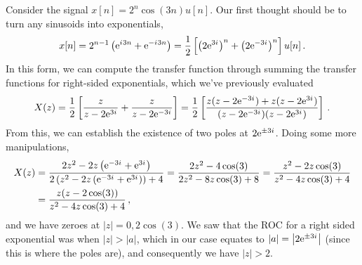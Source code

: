\begin{exmp}
  Consider the signal $x[n] = 2^n\cos(3n)u[n]$. Our first thought should be
  to turn any sinusoids into exponentials,
  \begin{displaymath}
    x[n] = 2^{n-1}\left(\mathrm{e}^{{i\mkern1mu} 3n} + \mathrm{e}^{-{i\mkern1mu} 3n}\right) = \frac{1}{2}\left[
      \left(2\mathrm{e}^{3{i\mkern1mu}}\right)^n + \left(2\mathrm{e}^{-3{i\mkern1mu}}\right)^n 
    \right] u[n] \,.
  \end{displaymath}
  In this form, we can compute the transfer function through summing
  the transfer functions for right-sided exponentials, which we've previously
  evaluated
  \begin{displaymath}
    X(z) = \frac{1}{2}\left[\frac{z}{z - 2\mathrm{e}^{3{i\mkern1mu}}} + \frac{z}{z - 2\mathrm{e}^{-3{i\mkern1mu}}}\right]
    = \frac{1}{2}\left[\frac{z(z-2\mathrm{e}^{-3{i\mkern1mu}}) + z(z - 2\mathrm{e}^{3{i\mkern1mu}})}{(z-2\mathrm{e}^{-3{i\mkern1mu}})(z-2\mathrm{e}^{3{i\mkern1mu}})}\right] \,.
  \end{displaymath}
  From this, we can establish the existence of two poles at $2\mathrm{e}^{\pm3{i\mkern1mu}}$.
  Doing some more manipulations,
  \begin{align*}
    X(z) &= \frac{
      2z^2 - 2z\left(\mathrm{e}^{-3{i\mkern1mu}} + \mathrm{e}^{3{i\mkern1mu}}\right)
    }{
      2\left(z^2 - 2z\left(\mathrm{e}^{-3{i\mkern1mu}} + \mathrm{e}^{3{i\mkern1mu}}\right)\right) + 4
    }
    = \frac{2z^2 - 4\cos(3)}{2z^2 - 8z\cos(3) + 8}
    = \frac{z^2 - 2z\cos(3)}{z^2 - 4z\cos(3) + 4} \\
    &= \frac{z(z - 2\cos(3))}{z^2 - 4z\cos(3) + 4} \,,
  \end{align*}
  and we have zeroes at $|z| = 0, 2\cos(3)$. We saw that the ROC for a right
  sided exponential was when $|z| > |a|$, which in our case equates to
  $|a| = \left|2\mathrm{e}^{\pm 3{i\mkern1mu}}\right|$ (since this is where the poles are),
  and consequently we have $|z| > 2$.
\end{exmp}
%
